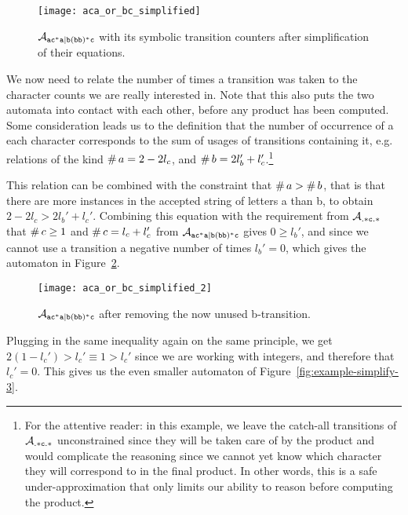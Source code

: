 \documentclass[acmsmall,review,anonymous]{acmart}\settopmatter{printfolios=true,printccs=false,printacmref=true}
\theoremstyle{definition}
\begin{document}
\begin{figure}[h]
  \begin{minipage}[b]{0.75\linewidth}
  \centering 
    \texttt{[image: aca\_or\_bc\_simplified]}
    \caption{$\mathcal{A}_{\mathtt{ac^*a|b(bb)^*c}}{}$ with its symbolic transition counters after
    simplification of their equations.}\label{fig:example-simplify-1}
  \end{minipage}
  \end{figure}

  We now need to relate the number of times a transition was taken to the
  character counts we are really interested in. Note that this also puts the two
  automata into contact with each other, before any product has been computed.
  Some consideration leads us to the definition that the number of occurrence of
  a each character corresponds to the sum of usages of transitions containing
  it, e.g. relations of the kind $\operatorname{\#}{a} = 2 - 2l_c$, and
  $\operatorname{\#}{b} = 2 l_b' + l_c'$.\footnote{For the attentive reader: in this
  example, we leave the catch-all transitions of $\mathcal{A}_{\mathtt{.*c.*}}$
  unconstrained since they will be taken care of by the product and would
  complicate the reasoning since we cannot yet know which character they will
  correspond to in the final product. In other words, this is a safe
  under-approximation that only limits our ability to reason before
  computing the product.}

This relation can be combined with the constraint that $\operatorname{\#}{a} >
\operatorname{\#}{b}$, that is that there are more instances in the accepted
string of letters a than b, to obtain $2 - 2l_c > 2 l_b' + l_c'$. Combining this
equation with the requirement from $\mathcal{A}_{\mathtt{.*c.*}}$ that
$\operatorname{\#}{c} \geq 1$ and $\operatorname{\#}{c} = l_c + l_c'$ from
$\mathcal{A}_{\mathtt{ac^*a|b(bb)^*c}}$ gives $0 \geq l_b'$, and since we cannot use a transition a negative
number of times $l_b' = 0$, which gives the automaton in
Figure~\ref{fig:example-simplify-2}.

\begin{figure}[h]
  \begin{minipage}[b]{0.75\linewidth}
  \centering 
    \texttt{[image: aca\_or\_bc\_simplified\_2]}
    \caption{$\mathcal{A}_{\mathtt{ac^*a|b(bb)^*c}}{}$ after removing the now unused b-transition.}\label{fig:example-simplify-2}
  \end{minipage}
  \end{figure}

  Plugging in the same inequality again on the same principle, we get $2(1 -
  l_c') > l_c' \equiv 1 > l_c'$ since we are working with integers, and
  therefore that $l_c' = 0$. This gives us the even smaller automaton of
  Figure~\ref{fig:example-simplify-3}.
\end{document}

